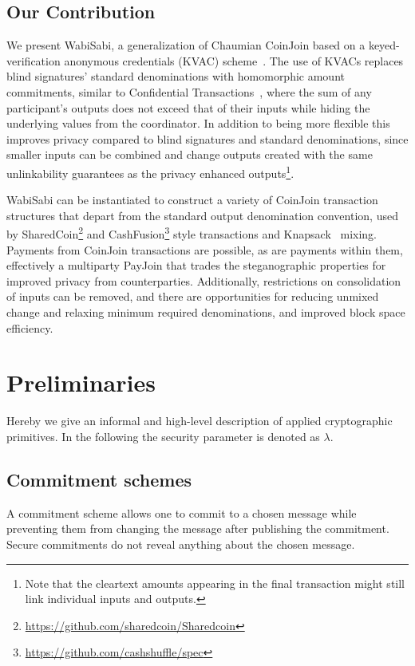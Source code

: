 \documentclass{article}
\begin{document}
\subsection{Our Contribution}

We present WabiSabi, a generalization of Chaumian CoinJoin based on a keyed-verification anonymous credentials (KVAC) scheme~\cite{chase2019signal}. The use of KVACs replaces blind signatures' standard denominations with homomorphic amount commitments, similar to Confidential Transactions~\cite{maxwell2016confidential}, where the sum of any participant's outputs does not exceed that of their inputs while hiding the underlying values from the coordinator. In addition to being more flexible this improves privacy compared to blind signatures and standard denominations, since smaller inputs can be combined and change outputs created with the same unlinkability guarantees as the privacy enhanced outputs\footnote{Note that the cleartext amounts appearing in the final transaction might still link individual inputs and outputs.}.

WabiSabi can be instantiated to construct a variety of CoinJoin transaction structures that depart from the standard output denomination convention, used by SharedCoin\footnote{\url{https://github.com/sharedcoin/Sharedcoin}} and CashFusion\footnote{\url{https://github.com/cashshuffle/spec}} style transactions and Knapsack~\cite{maurer2017anonymous} mixing. Payments from CoinJoin transactions are possible, as are payments within them, effectively a multiparty PayJoin that trades the steganographic properties for improved privacy from counterparties. Additionally, restrictions on consolidation of inputs can be removed, and there are opportunities for reducing unmixed change and relaxing minimum required denominations, and improved block space efficiency.

\section{Preliminaries}

Hereby we give an informal and high-level description of applied cryptographic primitives. In the following the security parameter is denoted as $\lambda$.

\subsection{Commitment schemes}
A commitment scheme allows one to commit to a chosen message while preventing them from changing the message after publishing the commitment. Secure commitments do not reveal anything about the chosen message.
\end{document}
